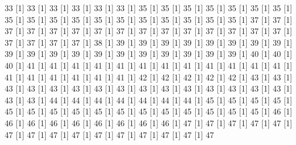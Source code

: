 \documentclass[12pt]{article}
\begin{document}
\begin{Schunk}
\begin{Soutput}
[1] 33%
[1] 33%
[1] 33%
[1] 33%
[1] 33%
[1] 33%
[1] 35%
[1] 35%
[1] 35%
[1] 35%
[1] 35%
[1] 35%
[1] 35%
[1] 35%
[1] 35%
[1] 35%
[1] 35%
[1] 35%
[1] 35%
[1] 35%
[1] 35%
[1] 35%
[1] 35%
[1] 35%
[1] 37%
[1] 37%
[1] 37%
[1] 37%
[1] 37%
[1] 37%
[1] 37%
[1] 37%
[1] 37%
[1] 37%
[1] 37%
[1] 37%
[1] 37%
[1] 37%
[1] 37%
[1] 37%
[1] 37%
[1] 37%
[1] 37%
[1] 38%
[1] 39%
[1] 39%
[1] 39%
[1] 39%
[1] 39%
[1] 39%
[1] 39%
[1] 39%
[1] 39%
[1] 39%
[1] 39%
[1] 39%
[1] 39%
[1] 39%
[1] 39%
[1] 39%
[1] 39%
[1] 39%
[1] 39%
[1] 40%
[1] 40%
[1] 40%
[1] 41%
[1] 41%
[1] 41%
[1] 41%
[1] 41%
[1] 41%
[1] 41%
[1] 41%
[1] 41%
[1] 41%
[1] 41%
[1] 41%
[1] 41%
[1] 41%
[1] 41%
[1] 41%
[1] 41%
[1] 41%
[1] 42%
[1] 42%
[1] 42%
[1] 42%
[1] 42%
[1] 43%
[1] 43%
[1] 43%
[1] 43%
[1] 43%
[1] 43%
[1] 43%
[1] 43%
[1] 43%
[1] 43%
[1] 43%
[1] 43%
[1] 43%
[1] 43%
[1] 43%
[1] 43%
[1] 43%
[1] 44%
[1] 44%
[1] 44%
[1] 44%
[1] 44%
[1] 44%
[1] 44%
[1] 45%
[1] 45%
[1] 45%
[1] 45%
[1] 45%
[1] 45%
[1] 45%
[1] 45%
[1] 45%
[1] 45%
[1] 45%
[1] 45%
[1] 45%
[1] 45%
[1] 45%
[1] 45%
[1] 46%
[1] 46%
[1] 46%
[1] 46%
[1] 46%
[1] 46%
[1] 46%
[1] 46%
[1] 46%
[1] 47%
[1] 47%
[1] 47%
[1] 47%
[1] 47%
[1] 47%
[1] 47%
[1] 47%
[1] 47%
[1] 47%
[1] 47%
[1] 47%
[1] 47%
[1] 47%
[1] 47%

\end{Soutput}
\end{Schunk}
\end{document}
